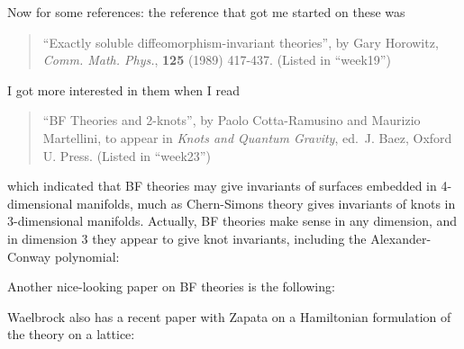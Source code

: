 \documentclass{article}
\def\tightlist{}
\renewcommand{\texttt}[1]{%
  \begingroup
  \ttfamily
  \begingroup\lccode`~=`/\lowercase{\endgroup\def~}{/\discretionary{}{}{}}%
  \begingroup\lccode`~=`[\lowercase{\endgroup\def~}{[\discretionary{}{}{}}%
  \begingroup\lccode`~=`.\lowercase{\endgroup\def~}{.\discretionary{}{}{}}%
  \catcode`/=\active\catcode`[=\active\catcode`.=\active
  \scantokens{#1\noexpand}%
  \endgroup
}
\begin{document}
Now for some references: the reference that got me started on these was

\begin{quote}
``Exactly soluble diffeomorphism-invariant theories'', by Gary Horowitz,
\emph{Comm. Math. Phys.}, \textbf{125} (1989) 417-437. (Listed in
``week19'')
\end{quote}

I got more interested in them when I read

\begin{quote}
``BF Theories and 2-knots'', by Paolo Cotta-Ramusino and Maurizio
Martellini, to appear in \emph{Knots and Quantum Gravity}, ed.~J. Baez,
Oxford U. Press. (Listed in ``week23'')
\end{quote}

which indicated that BF theories may give invariants of surfaces
embedded in 4-dimensional manifolds, much as Chern-Simons theory gives
invariants of knots in 3-dimensional manifolds. Actually, BF theories
make sense in any dimension, and in dimension 3 they appear to give knot
invariants, including the Alexander-Conway polynomial:


Another nice-looking paper on BF theories is the following:


Waelbrock also has a recent paper with Zapata on a Hamiltonian
formulation of the theory on a lattice:

\end{document}
